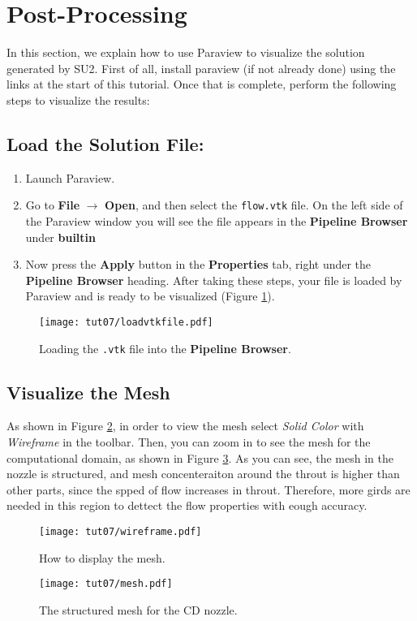 \section{Post-Processing}
In this section, we explain how to use Paraview to visualize the solution generated by SU2. First of all, install paraview (if not already done) using the links at the start of this tutorial. Once that is complete, perform the following steps to visualize the results:
\subsection{Load the Solution File:}
\begin{enumerate}[label=\arabic*)]
	\item Launch Paraview.
	\item Go to \textbf{File} $\rightarrow$ \textbf{Open}, and then select the \texttt{flow.vtk} file. On the left side of the Paraview window you will see the file appears in the \textbf{Pipeline Browser} under \textbf{builtin}
	\item Now press the \textbf{Apply} button in the \textbf{Properties} tab, right under the \textbf{Pipeline Browser} heading. After taking these steps, your file is loaded by Paraview and is ready to be visualized (Figure \ref{fig7:load}).
\end{enumerate}
\begin{figure}[ht]
	\centering
	\texttt{[image: tut07/loadvtkfile.pdf]}
	\caption{Loading the \texttt{.vtk} file into the \textbf{Pipeline Browser}.}
	\label{fig7:load}
\end{figure}
\subsection{Visualize the Mesh}
As shown in Figure \ref{fig7:wireframe}, in order to view the mesh select \textit{Solid Color} with \textit{Wireframe} in the toolbar. Then, you can zoom in to see the mesh for the computational domain, as shown in Figure \ref{fig7:mesh}. As you can see, the mesh in the nozzle is structured, and mesh concenteraiton around the throut is higher than other parts, since the spped of flow increases in throut. Therefore, more girds are needed in this region to dettect the flow properties with eough accuracy.
\begin{figure}[ht]
	\centering
	\texttt{[image: tut07/wireframe.pdf]}
	\caption{How to display the mesh.}
	\label{fig7:wireframe}
\end{figure}
\begin{figure}[ht]
	\centering
	\texttt{[image: tut07/mesh.pdf]}
	\caption{The structured mesh for the CD nozzle.}
	\label{fig7:mesh}
\end{figure}
